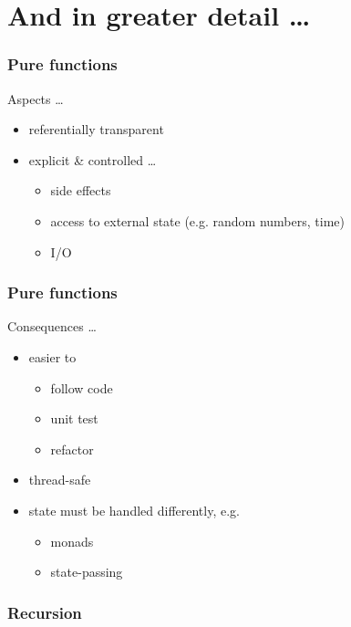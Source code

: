 \documentclass[xcolor={dvipsnames}]{beamer}
\begin{document}
\section{And in greater detail \ldots}

\begin{frame}
  \frametitle{Pure functions}
  Aspects \ldots
  \begin{itemize}
    \item<2-> referentially transparent 
    \item<3-> explicit \& controlled \ldots
      \begin{itemize}
        \item side effects
        \item access to external state (e.g. random numbers, time)
        \item I/O
      \end{itemize}
  \end{itemize}
\end{frame}

\begin{frame}
  \frametitle{Pure functions}
  Consequences \ldots
  \begin{itemize}
    \item<2-> easier to
      \begin{itemize}
        \item follow code
        \item unit test
        \item refactor
      \end{itemize}
    \item<3-> thread-safe
    \item<4-> state must be handled differently, e.g.
      \begin{itemize}
        \item monads
        \item state-passing
      \end{itemize}
  \end{itemize}
\end{frame}

\begin{frame}[fragile]
  \frametitle{Recursion}
\end{frame}
\end{document}
